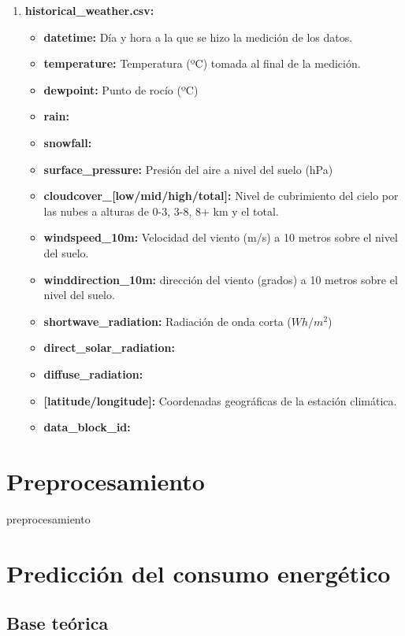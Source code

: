 \documentclass[a4paper,12pt]{article}
\begin{document}
\begin{enumerate}
    \item \textbf{historical\_weather.csv:}
    \begin{itemize}
        \item \textbf{datetime:} Día y hora a la que se hizo la 
        medición de los datos.
        \item \textbf{temperature:} Temperatura 
        (ºC) tomada al final de la medición.
        \item \textbf{dewpoint:} Punto de rocío (ºC)
        \item \textbf{rain:}
        \item \textbf{snowfall:}
        \item \textbf{surface\_pressure:} Presión del aire a 
        nivel del suelo (hPa)
        \item \textbf{cloudcover\_[low/mid/high/total]:}
        Nivel de cubrimiento del cielo por las nubes a
        alturas de 0-3, 3-8, 8+ km y el total. 
        \item \textbf{windspeed\_10m:} Velocidad del viento (m/s) 
        a 10 metros sobre el nivel del suelo.
        \item \textbf{winddirection\_10m:} dirección del viento
        (grados) a 10 metros sobre el nivel del suelo.
        \item \textbf{shortwave\_radiation:} Radiación de onda 
        corta ($Wh/m^{2}$)
        \item \textbf{direct\_solar\_radiation:}
        \item \textbf{diffuse\_radiation:}
        \item \textbf{[latitude/longitude]:} Coordenadas geográficas
        de la estación climática.
        \item \textbf{data\_block\_id:}
    \end{itemize}

\end{enumerate}

\section{Preprocesamiento}
preprocesamiento

\section{Predicción del consumo energético}

\subsection{Base teórica}
\end{document}
